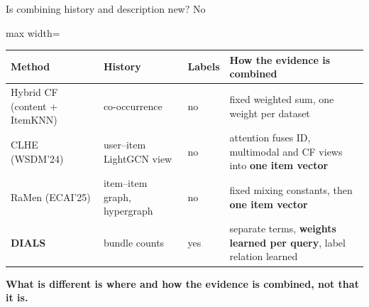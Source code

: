 \documentclass[10pt,aspectratio=169]{beamer}
\newcommand{\key}[1]{\textcolor{Accent}{\textbf{#1}}}
\begin{document}
\begin{frame}{Is combining history and description new? No}
\renewcommand{\arraystretch}{1.25}\small
\begin{adjustbox}{max width=\textwidth}\begin{tabular}{@{}>{\raggedright\arraybackslash}p{}>{\raggedright\arraybackslash}p{}>{\raggedright\arraybackslash}p{}>{\raggedright\arraybackslash}p{}@{}}
\toprule
\textbf{Method} & \textbf{History} & \textbf{Labels} & \textbf{How the evidence is combined}\\\midrule
Hybrid CF (content + ItemKNN) & co-occurrence & no & fixed weighted sum, one weight per dataset\\
CLHE (WSDM'24) & user--item LightGCN view & no & attention fuses ID, multimodal and CF views into \key{one item vector}\\
RaMen (ECAI'25) & item--item graph, hypergraph & no & fixed mixing constants, then \key{one item vector}\\
\key{DIALS} & bundle counts & yes & separate terms, \key{weights learned per query}, label relation learned\\\bottomrule
\end{tabular}\end{adjustbox}\par
\vspace{2mm}
\key{What is different is where and how the evidence is combined, not that it is.}
\end{frame}
\end{document}
